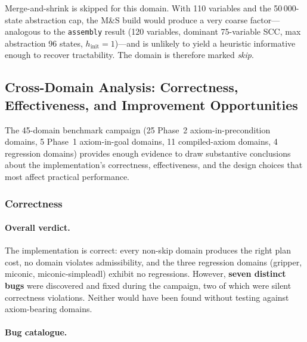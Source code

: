 \documentclass[11pt,a4paper]{article}
\begin{document}
Merge-and-shrink is skipped for this domain.
With 110 variables and the 50\,000-state abstraction cap, the M\&S build
would produce a very coarse factor---analogous to the \texttt{assembly} result
(120 variables, dominant 75-variable SCC, max abstraction 96 states,
$h_{\mathrm{init}} = 1$)---and is unlikely to yield a heuristic informative
enough to recover tractability.
The domain is therefore marked \emph{skip}.

\subsection{Cross-Domain Analysis: Correctness, Effectiveness, and Improvement
Opportunities}
\label{sec:cross-domain-analysis}

The 45-domain benchmark campaign (25 Phase~2 axiom-in-precondition domains,
5 Phase~1 axiom-in-goal domains, 11 compiled-axiom domains, 4 regression
domains) provides enough evidence to draw substantive conclusions about the
implementation's correctness, effectiveness, and the design choices that most
affect practical performance.

\subsubsection{Correctness}

\paragraph{Overall verdict.}
The implementation is correct: every non-skip domain produces the right plan
cost, no domain violates admissibility, and the three regression domains
(gripper, miconic, miconic-simpleadl) exhibit no regressions.  However,
\textbf{seven distinct bugs} were discovered and fixed during the campaign, two
of which were silent correctness violations.  Neither would have been found
without testing against axiom-bearing domains.

\paragraph{Bug catalogue.}
\end{document}
